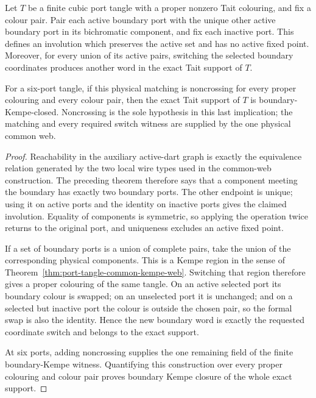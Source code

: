\begin{theorem}
\label{thm:port-tangle-physical-kempe-matching}
Let $T$ be a finite cubic port tangle with a proper nonzero Tait colouring,
and fix a colour pair.  Pair each active boundary port with the unique other
active boundary port in its bichromatic component, and fix each inactive
port.  This defines an involution which preserves the active set and has no
active fixed point.  Moreover, for every union of its active pairs, switching
the selected boundary coordinates produces another word in the exact Tait
support of $T$.

For a six-port tangle, if this physical matching is noncrossing for every
proper colouring and every colour pair, then the exact Tait support of $T$ is
boundary-Kempe-closed.  Noncrossing is the sole hypothesis in this last
implication; the matching and every required switch witness are supplied by
the one physical common web.
\end{theorem}

\begin{proof}
Reachability in the auxiliary active-dart graph is exactly the equivalence
relation generated by the two local wire types used in the common-web
construction.  The preceding theorem therefore says that a component meeting
the boundary has exactly two boundary ports.  The other endpoint is unique;
using it on active ports and the identity on inactive ports gives the claimed
involution.  Equality of components is symmetric, so applying the operation
twice returns to the original port, and uniqueness excludes an active fixed
point.

If a set of boundary ports is a union of complete pairs, take the union of
the corresponding physical components.  This is a Kempe region in the sense
of Theorem~\ref{thm:port-tangle-common-kempe-web}.  Switching that region
therefore gives a proper colouring of the same tangle.  On an active selected
port its boundary colour is swapped; on an unselected port it is unchanged;
and on a selected but inactive port the colour is outside the chosen pair, so
the formal swap is also the identity.  Hence the new boundary word is exactly
the requested coordinate switch and belongs to the exact support.

At six ports, adding noncrossing supplies the one remaining field of the
finite boundary-Kempe witness.  Quantifying this construction over every
proper colouring and colour pair proves boundary Kempe closure of the whole
exact support.
\end{proof}


